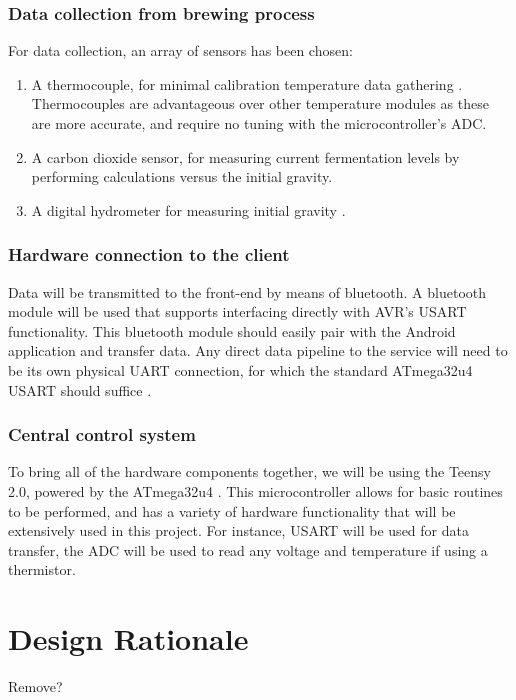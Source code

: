 \documentclass[draftclsnofoot,onecolumn,letterpaper,10pt]{IEEEtran}
\begin{document}
\subsubsection{Data collection from brewing process}
For data collection, an array of sensors has been chosen:
\begin{enumerate}
	\item A thermocouple, for minimal calibration temperature data gathering \cite{thermocouple}. Thermocouples are advantageous over other 
		temperature modules as these are more accurate, and require no tuning with the microcontroller's ADC.
	\item A carbon dioxide sensor, for measuring current fermentation levels by performing calculations versus the initial gravity.
	\item A digital hydrometer for measuring initial gravity \cite{makingmead}.
\end{enumerate}
\subsubsection{Hardware connection to the client}
Data will be transmitted to the front-end by means of bluetooth. A bluetooth module will be used that supports interfacing directly with AVR's
USART functionality. This bluetooth module should easily pair with the Android application and transfer data. Any direct data pipeline to the service
will need to be its own physical UART connection, for which the standard ATmega32u4 USART should suffice \cite{datasheet}.

\subsubsection{Central control system}
To bring all of the hardware components together, we will be using the Teensy 2.0, powered by the ATmega32u4 \cite{teensy}.
This microcontroller allows for basic routines to be performed, and has a variety of hardware functionality that will be extensively used in this project.
For instance, USART will be used for data transfer, the ADC will be used to read any voltage and temperature if using a thermistor.

\section{Design Rationale}
Remove?
\end{document}
